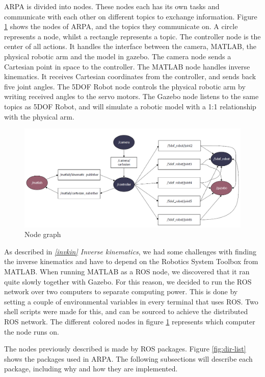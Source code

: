 \documentclass[11pt,a4paper, titlepage]{article}
\begin{document}
	ARPA is divided into nodes. These nodes each has its own tasks and communicate with each other on different topics to exchange information. Figure \ref{fig:nodegraph} shows the nodes of ARPA, and the topics they communicate on. A circle represents a node, whilst a rectangle represents a topic. The controller node is the center of all actions. It handles the interface between the camera, MATLAB, the physical robotic arm and the model in gazebo. The camera node  sends a Cartesian point in space to the controller. The MATLAB node handles inverse kinematics. It receives Cartesian coordinates from the controller, and sends back five joint angles. The 5DOF Robot node controls the physical robotic arm by writing received angles to the servo motors. The Gazebo node listens to the same topics as 5DOF Robot, and will simulate a robotic model with a 1:1 relationship with the physical arm.
	
	\begin{figure}[H]
		\includegraphics[width=\linewidth]{../Diagrams/NodeGraph-v1.png}
		\caption{Node graph}
		\label{fig:nodegraph}
	\end{figure}
	
As described in \textit{\ref{invkin} Inverse kinematics}, we had some challenges with finding the inverse kinematics and have to depend on the Robotics System Toolbox from MATLAB. When running MATLAB as a ROS node, we discovered that it ran quite slowly together with Gazebo. For this reason, we decided to run the ROS network over two computers to separate computing power. This is done by setting a couple of environmental variables in every terminal that uses ROS. Two shell scripts were made for this, and can be sourced to achieve the distributed ROS network. The different colored nodes in figure \ref{fig:nodegraph} represents which computer the node runs on.

	
The nodes previously described is made by ROS packages. Figure \ref{fig:dir-list} shows the packages used in ARPA. The following subsections will describe each package, including why and how they are implemented.
\end{document}
